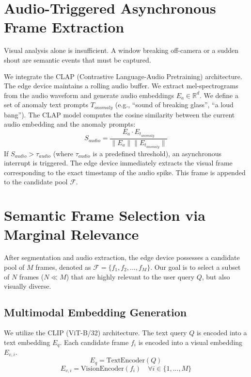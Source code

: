 \documentclass[12pt, a4paper]{report}
\begin{document}
\section{Audio-Triggered Asynchronous Frame Extraction}
Visual analysis alone is insufficient. A window breaking off-camera or a sudden shout are semantic events that must be captured.

We integrate the CLAP (Contrastive Language-Audio Pretraining) architecture. The edge device maintains a rolling audio buffer. We extract mel-spectrograms from the audio waveform and generate audio embeddings $E_a \in \mathbb{R}^d$. 
We define a set of anomaly text prompts $T_{anomaly}$ (e.g., ``sound of breaking glass'', ``a loud bang''). The CLAP model computes the cosine similarity between the current audio embedding and the anomaly prompts:
\begin{equation}
S_{audio} = \frac{E_a \cdot E_{t_{anomaly}}}{\|E_a\| \|E_{t_{anomaly}}\|}
\end{equation}
If $S_{audio} > \tau_{audio}$ (where $\tau_{audio}$ is a predefined threshold), an asynchronous interrupt is triggered. The edge device immediately extracts the visual frame corresponding to the exact timestamp of the audio spike. This frame is appended to the candidate pool $\mathcal{F}$.

\section{Semantic Frame Selection via Marginal Relevance}
After segmentation and audio extraction, the edge device possesses a candidate pool of $M$ frames, denoted as $\mathcal{F} = \{f_1, f_2, ..., f_M\}$. Our goal is to select a subset of $N$ frames ($N \ll M$) that are highly relevant to the user query $Q$, but also visually diverse.

\subsection{Multimodal Embedding Generation}
We utilize the CLIP (ViT-B/32) architecture. The text query $Q$ is encoded into a text embedding $E_q$. Each candidate frame $f_i$ is encoded into a visual embedding $E_{v,i}$.
\begin{equation}
E_q = \text{TextEncoder}(Q)
\end{equation}
\begin{equation}
E_{v,i} = \text{VisionEncoder}(f_i) \quad \forall i \in \{1, ..., M\}
\end{equation}
\end{document}
